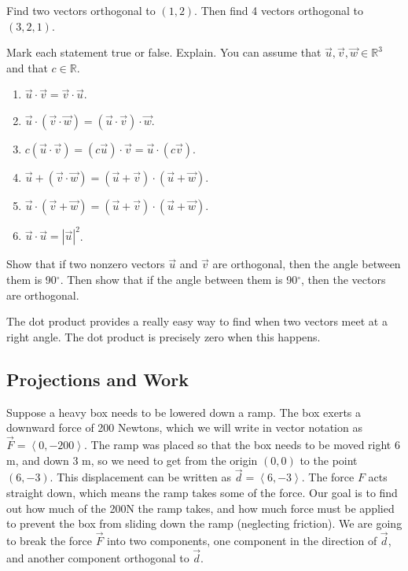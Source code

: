 \begin{problem}
Find two vectors orthogonal to $(1,2)$.  Then find 4 vectors orthogonal to $(3,2,1)$.  
\end{problem}

\begin{problem}
Mark each statement true or false. Explain. You can assume that $\vec u,\vec v,\vec w\in\mathbb{R}^3$ and that $c\in\mathbb{R}$.
\begin{enumerate}
\item $\vec u\cdot \vec v=\vec v\cdot \vec u$. 
\item $\vec u\cdot (\vec v\cdot \vec w)=(\vec u\cdot\vec v)\cdot\vec w$. 
\item $c(\vec u\cdot \vec v)=(c\vec u)\cdot \vec v=\vec u\cdot (c\vec v)$. 
\item $\vec u+(\vec v\cdot \vec w)=(\vec u+\vec v)\cdot(\vec u+\vec w)$. 
\item $\vec u\cdot (\vec v+ \vec w)=(\vec u+\vec v)\cdot(\vec u+\vec w)$. 
\item $\vec u\cdot \vec u= |\vec u|^2$. 
\end{enumerate}
\end{problem}

\begin{problem} 
Show that if two nonzero vectors $\vec u$ and $\vec v$ are orthogonal, then the angle between them is 90$^\circ$. Then show that if the angle between them is 90$^\circ$, then the vectors are orthogonal.
\end{problem}
The dot product provides a really easy way to find when two vectors meet at a right angle. The dot product is precisely zero when this happens.

\subsection{Projections and Work}
Suppose a heavy box needs to be lowered down a ramp.  
The box exerts a downward force of 200 Newtons, which we will write in vector notation as $\vec F=\left<0,-200\right>$. 
The ramp was placed so that the box needs to be moved right 6 m, and down 3 m, so we need to get from the origin $(0,0)$ to the point $(6,-3)$.  This displacement can be written as $\vec d=\left<6,-3\right>$. The force $F$ acts straight down, which means the ramp takes some of the force. Our goal is to find out how much of the 200N the ramp takes, and how much force must be applied to prevent the box from sliding down the ramp (neglecting friction). We are going to break the force $\vec F$ into two components, one component in the direction of $\vec d$, and another component orthogonal to $\vec d$. 

